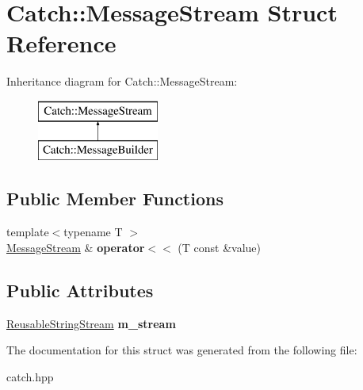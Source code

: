 \hypertarget{structCatch_1_1MessageStream}{}\section{Catch\+::Message\+Stream Struct Reference}
\label{structCatch_1_1MessageStream}
Inheritance diagram for Catch\+::Message\+Stream\+:\begin{figure}[H]
\begin{center}
\leavevmode
\includegraphics[height=2.000000cm]{structCatch_1_1MessageStream}
\end{center}
\end{figure}
\subsection*{Public Member Functions}
\begin{DoxyCompactItemize}
\item 
\mbox{\label{structCatch_1_1MessageStream_a554c4aff5925a077e9fe9d858217428d}} 
{\footnotesize template$<$typename T $>$ }\\\mbox{\hyperlink{structCatch_1_1MessageStream}{Message\+Stream}} \& {\bfseries operator$<$$<$} (T const \&value)
\end{DoxyCompactItemize}
\subsection*{Public Attributes}
\begin{DoxyCompactItemize}
\item 
\mbox{\label{structCatch_1_1MessageStream_a9202520faed8882ef469db9f353ec578}} 
\mbox{\hyperlink{classCatch_1_1ReusableStringStream}{Reusable\+String\+Stream}} {\bfseries m\+\_\+stream}
\end{DoxyCompactItemize}


The documentation for this struct was generated from the following file\+:\begin{DoxyCompactItemize}
\item 
catch.\+hpp\end{DoxyCompactItemize}
